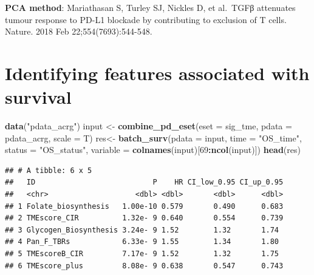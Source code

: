 \documentclass[
  12pt,
]{book}
\newenvironment{Shaded}{\begin{snugshade}}{\end{snugshade}}
\newcommand{\AttributeTok}[1]{\textcolor[rgb]{0.13,0.29,0.53}{#1}}
\newcommand{\DecValTok}[1]{\textcolor[rgb]{0.00,0.00,0.81}{#1}}
\newcommand{\FunctionTok}[1]{\textcolor[rgb]{0.13,0.29,0.53}{\textbf{#1}}}
\newcommand{\NormalTok}[1]{#1}
\newcommand{\OtherTok}[1]{\textcolor[rgb]{0.56,0.35,0.01}{#1}}
\newcommand{\SpecialCharTok}[1]{\textcolor[rgb]{0.81,0.36,0.00}{\textbf{#1}}}
\newcommand{\StringTok}[1]{\textcolor[rgb]{0.31,0.60,0.02}{#1}}
\theoremstyle{definition}
\theoremstyle{definition}
\theoremstyle{definition}
\theoremstyle{definition}
\theoremstyle{remark}
\begin{document}
\textbf{PCA method}: Mariathasan S, Turley SJ, Nickles D, et al.~TGFβ attenuates tumour response to PD-L1 blockade by contributing to exclusion of T cells. Nature. 2018 Feb 22;554(7693):544-548.

\hypertarget{identifying-features-associated-with-survival}{%
\section{Identifying features associated with survival}\label{identifying-features-associated-with-survival}}

\begin{Shaded}
\begin{Highlighting}[]
\FunctionTok{data}\NormalTok{(}\StringTok{"pdata\_acrg"}\NormalTok{)}
\NormalTok{input }\OtherTok{\textless{}{-}} \FunctionTok{combine\_pd\_eset}\NormalTok{(}\AttributeTok{eset =}\NormalTok{ sig\_tme, }\AttributeTok{pdata =}\NormalTok{ pdata\_acrg, }\AttributeTok{scale =}\NormalTok{ T)}
\NormalTok{res}\OtherTok{\textless{}{-}} \FunctionTok{batch\_surv}\NormalTok{(}\AttributeTok{pdata    =}\NormalTok{ input,}
                 \AttributeTok{time     =} \StringTok{"OS\_time"}\NormalTok{, }
                 \AttributeTok{status   =} \StringTok{"OS\_status"}\NormalTok{, }
                 \AttributeTok{variable =} \FunctionTok{colnames}\NormalTok{(input)[}\DecValTok{69}\SpecialCharTok{:}\FunctionTok{ncol}\NormalTok{(input)])}
\FunctionTok{head}\NormalTok{(res)}
\end{Highlighting}
\end{Shaded}

\begin{verbatim}
## # A tibble: 6 x 5
##   ID                           P    HR CI_low_0.95 CI_up_0.95
##   <chr>                    <dbl> <dbl>       <dbl>      <dbl>
## 1 Folate_biosynthesis   1.00e-10 0.579       0.490      0.683
## 2 TMEscore_CIR          1.32e- 9 0.640       0.554      0.739
## 3 Glycogen_Biosynthesis 3.24e- 9 1.52        1.32       1.74 
## 4 Pan_F_TBRs            6.33e- 9 1.55        1.34       1.80 
## 5 TMEscoreB_CIR         7.17e- 9 1.52        1.32       1.75 
## 6 TMEscore_plus         8.08e- 9 0.638       0.547      0.743
\end{verbatim}

\begin{Shaded}
\end{Shaded}
\end{document}
